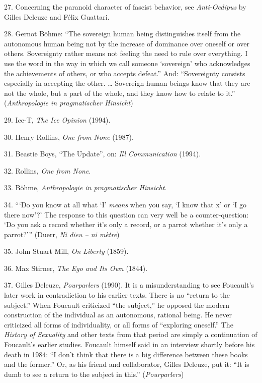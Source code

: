 {    27. Concerning the paranoid character of fascist behavior, see
    \textit{Anti-Oedipus} by Gilles Deleuze and Félix Guattari.

    28. Gernot Böhme: “The sovereign human being distinguishes itself from the
    autonomous human being not by the increase of dominance over oneself or over
    others. Sovereignty rather means not feeling the need to rule over
    everything. I use the word in the way in which we call someone ‘sovereign’
    who acknowledges the achievements of others, or who accepts defeat.” And:
    “Sovereignty consists especially in accepting the other. … Sovereign human
    beings know that they are not the whole, but a part of the whole, and they
    know how to relate to it.” (\textit{Anthropologie in pragmatischer
    Hinsicht})

    29. Ice-T, \textit{The Ice Opinion} (1994).

    30. Henry Rollins, \textit{One from None} (1987).

    31. Beastie Boys, “The Update”, on: \textit{Ill Communication} (1994).

    32. Rollins, \textit{One from None}.

    33. Böhme, \textit{Anthropologie in pragmatischer Hinsicht}.

    34. “‘Do you know at all what ‘I’ \textit{means} when you say, ‘I know that
    x’ or ‘I go there now’?’ The response to this question can very well be a
    counter-question: ‘Do you ask a record whether it’s only a record, or a
    parrot whether it’s only a parrot?’” (Duerr, \textit{Ni dieu – ni mètre})

    35. John Stuart Mill, \textit{On Liberty} (1859).

    36. Max Stirner, \textit{The Ego and Its Own} (1844).

    37. Gilles Deleuze, \textit{Pourparlers} (1990). It is a misunderstanding to
    see Foucault’s later work in contradiction to his earlier texts. There is no
    “return to the subject.” When Foucault criticized “the subject,” he opposed
    the modern construction of the individual as an autonomous, rational being.
    He never criticized all forms of individuality, or all forms of “exploring
    oneself.” The \textit{History of Sexuality} and other texts from that period
    are simply a continuation of Foucault’s earlier studies. Foucault himself
    said in an interview shortly before his death in 1984: “I don’t think that
    there is a big difference between these books and the former.” Or, as his
    friend and collaborator, Gilles Deleuze, put it: “It is dumb to see a return
    to the subject in this.” (\textit{Pourparlers})

}
